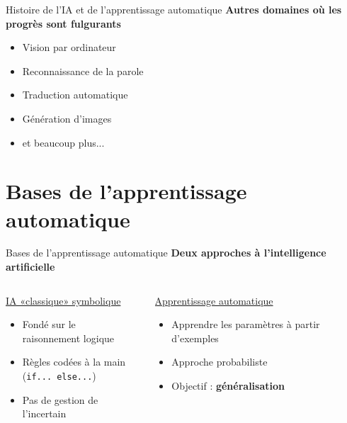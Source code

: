 \documentclass[french]{beamer}
\begin{document}
\begin{frame}{Histoire de l'IA et de l'apprentissage automatique}
\textbf{Autres domaines où les progrès sont fulgurants}
\begin{itemize}
 \item Vision par ordinateur
 \item Reconnaissance de la parole
 \item Traduction automatique
 \item Génération d'images
 \item et beaucoup plus...
\end{itemize}

\end{frame}

\section{Bases de l'apprentissage automatique}

\begin{frame}{Bases de l'apprentissage automatique}
\textbf{Deux approches à l'intelligence artificielle}
\vspace{0.5cm}

\begin{columns}[T] %
\begin{column}{.48\textwidth}
\begin{center}
\underline{IA «classique» symbolique}
\end{center}
\begin{itemize}
	\item Fondé sur le \\raisonnement logique
	\item Règles codées à la main \\(\texttt{if... else...})
	\item Pas de gestion de l'incertain
\end{itemize}

\end{column}%
\hfill%
\begin{column}{.48\textwidth}
\begin{center}
\underline{Apprentissage automatique}
\end{center}
\begin{itemize}
	\item Apprendre les paramètres à partir d'exemples
	\item Approche probabiliste
	\item Objectif : \textbf{généralisation}
\end{itemize}
\end{column}%
\end{columns}
\end{frame}
\end{document}
